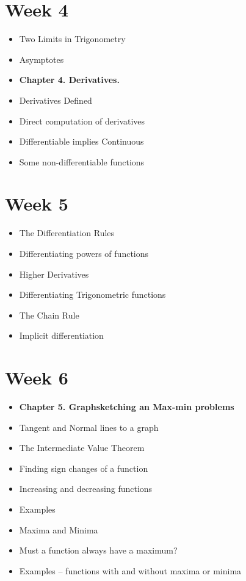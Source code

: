\documentclass{amsproc}
\begin{document}
\section*{Week 4}
\begin{itemize}
\item Two Limits in Trigonometry
\item Asymptotes
\item \textbf{Chapter 4.  Derivatives.}
\item Derivatives Defined
\item Direct computation of derivatives
\item Differentiable implies Continuous
\item Some non-differentiable functions
\end{itemize}

\section*{Week 5}
\begin{itemize}
\item The Differentiation Rules
\item Differentiating powers of functions
\item Higher Derivatives
\item Differentiating Trigonometric functions
\item The Chain Rule
\item Implicit differentiation
\end{itemize}

\section*{Week 6}
\begin{itemize}
\item \textbf{Chapter 5. Graphsketching an Max-min problems}
\item Tangent and Normal lines to a graph
\item The Intermediate Value Theorem
\item Finding sign changes of a function
\item Increasing and decreasing functions
\item Examples
\item Maxima and Minima
\item Must a function always have a maximum?
\item Examples -- functions with and without maxima or minima
\end{itemize}
\end{document}

